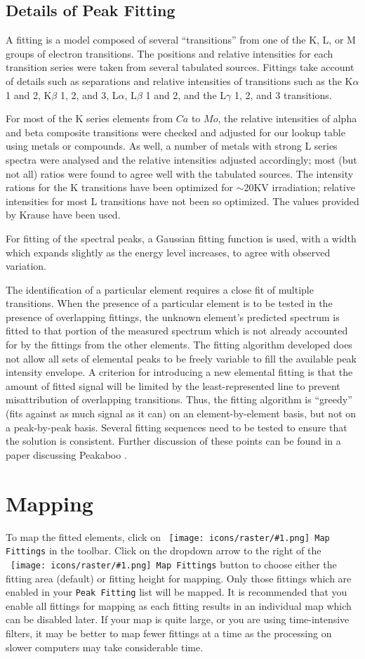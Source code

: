 \documentclass[article,twoside,11pt]{report}
\newcommand{\command}[1]{\texttt{#1}}
\newcommand{\icon}[1]{\texttt{[image: icons/raster/\#1.png]}}
\newcommand{\button}[2]{\ \command{\icon{#1} #2}}
\newcommand{\element}[1]{$#1$}
\newcommand{\tocchapter}[1]{\cleardoublepage\chapter*{#1}\addcontentsline{toc}{chapter}{#1}}
\newcommand{\tocsection}[1]{\section*{#1}\addcontentsline{toc}{section}{#1}}
\begin{document}
\tocsection{Details of Peak Fitting}

A fitting is a model composed of several ``transitions'' from one of the K, L, or M groups of 
electron transitions. The positions and relative intensities for each transition series
were taken from several tabulated sources. Fittings take account of details such as 
separations and relative intensities of transitions such as the K$\alpha$ 1 and 2,  
K$\beta$ 1, 2, and 3, L$\alpha$, L$\beta$ 1 and 2, and the L$\gamma$ 1, 2, and 3 transitions.

For most of the K series elements from \element{Ca} to \element{Mo}, the relative 
intensities of alpha and beta composite transitions were checked and adjusted for our 
lookup table using metals or compounds. As well, a number of metals with strong L 
series spectra were analysed and the relative intensities adjusted accordingly; 
most (but not all) ratios were found to agree well with the tabulated sources. The 
intensity rations for the K transitions have been optimized for $\sim$20KV irradiation; relative 
intensities for most L transitions have not been so optimized. The values provided by Krause 
\cite{kraus} have been used. 

For fitting of the spectral peaks, a Gaussian fitting function is used, with a width which
expands slightly as the energy level increases, to agree with observed variation.

The identification of a particular element requires a close fit of multiple transitions. 
When the presence of a particular element is to be tested in the presence of overlapping 
fittings, the unknown element's predicted spectrum is fitted to that portion of the 
measured spectrum which is not already accounted for by the fittings from the other 
elements. The fitting algorithm developed does not allow all sets of elemental peaks to 
be freely variable to fill the available peak intensity envelope. A criterion for 
introducing a new elemental fitting is that the amount of fitted signal will be limited 
by the least-represented line to prevent misattribution of overlapping transitions. Thus, the 
fitting algorithm is ``greedy'' (fits against as much signal as it can) on an 
element-by-element basis, but not on a peak-by-peak basis. Several fitting sequences 
need to be tested to ensure that the solution is consistent. Further discussion of these 
points can be found in a paper discussing Peakaboo \cite{mcintyre}.


\tocchapter{Mapping}

To map the fitted elements, click on \button{map}{Map Fittings} in the toolbar. 
Click on the dropdown arrow to the right of the \button{map}{Map Fittings} button to 
choose either the fitting area (default) or fitting height for mapping. Only those 
fittings which are enabled in your \command{Peak Fitting} list will be mapped. It 
is recommended that you enable all fittings for mapping as each fitting results in 
an individual map which can be disabled later. If your map is quite large, or you 
are using time-intensive filters, it may be better to map fewer fittings at a 
time as the processing on slower computers may take considerable time.
\end{document}
